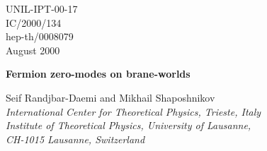 \documentclass[a4paper,12pt]{article}
\begin{document}
\topmargin -1.0cm
\oddsidemargin -0.8cm
\evensidemargin -0.8cm
\pagestyle{empty}
\begin{flushright}
UNIL-IPT-00-17\\
IC/2000/134\\
hep-th/0008079\\
August 2000
\end{flushright}
\vspace*{5mm}

\begin{center}

{\Large\bf Fermion zero-modes on brane-worlds \\}
\vspace{1.0cm}

{\large Seif Randjbar-Daemi\coordHE{}  and 
Mikhail Shaposhnikov\coordHE{}}\\
\vspace{.6cm}
{\it {\coordHE{}International Center for Theoretical Physics, Trieste,
Italy}}\\
{\it {\coordHE{}Institute of Theoretical Physics, University of Lausanne,
\\
CH-1015 Lausanne, Switzerland}}\\

\vspace{.4cm}
\end{center}

\vspace{1cm}
\begin{abstract}

We study localization of bulk fermions on a brane with inclusion of
Yang-Mills and scalar backgrounds in higher dimensions and give the
conditions under which localized chiral fermions can be obtained. 

\end{abstract}

\vfill


\eject
\pagestyle{empty}
\setcounter{page}{1}
\setcounter{footnote}{0}
\pagestyle{plain}

\end{document}
